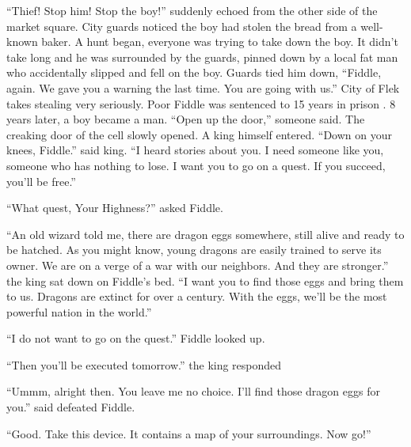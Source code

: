“Thief! Stop him! Stop the boy!” suddenly echoed from the other side of the market square. City guards noticed the boy had stolen the bread from a well-known baker. A hunt began, everyone was trying to take down the boy. It didn’t take long and he was surrounded by the guards, pinned down by a local fat man who accidentally slipped and fell on the boy. Guards tied him down, “Fiddle, again. We gave you a warning the last time. You are going with us.” City of Flek takes stealing very seriously. Poor Fiddle was sentenced to 15 years in prison
.
8 years later, a boy became a man. “Open up the door,” someone said. The creaking door of the cell slowly opened. A king himself entered. “Down on your knees, Fiddle.” said king. “I heard stories about you. I need someone like you, someone who has nothing to lose. I want you to go on a quest. If you succeed, you’ll be free.”

“What quest, Your Highness?” asked Fiddle.

“An old wizard told me, there are dragon eggs somewhere, still alive and ready to be hatched. As you might know, young dragons are easily trained to serve its owner. We are on a verge of a war with our neighbors. And they are stronger.” the king sat down on Fiddle’s bed. “I want you to find those eggs and bring them to us. Dragons are extinct for over a century. With the eggs, we’ll be the most powerful nation in the world.”

“I do not want to go on the quest.” Fiddle looked up.

“Then you’ll be executed tomorrow.” the king responded

“Ummm, alright then. You leave me no choice. I’ll find those dragon eggs for you.” said defeated Fiddle.

“Good. Take this device. It contains a map of your surroundings. Now go!”
